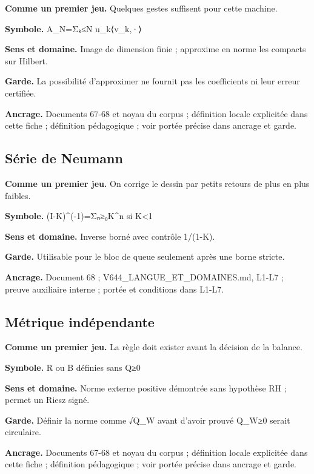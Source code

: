 \documentclass[
  9pt,
  a4paper,
]{article}
\begin{document}
\textbf{Comme un premier jeu.} Quelques gestes suffisent pour cette
machine.

\textbf{Symbole.} A\_N=Σₖ≤N u\_k⟨v\_k,·⟩

\textbf{Sens et domaine.} Image de dimension finie ; approxime en norme
les compacts sur Hilbert.

\textbf{Garde.} La possibilité d'approximer ne fournit pas les
coefficients ni leur erreur certifiée.

\textbf{Ancrage.} Documents 67-68 et noyau du corpus ; définition locale
explicitée dans cette fiche ; définition pédagogique ; voir portée
précise dans ancrage et garde.

\hypertarget{suxe9rie-de-neumann}{%
\subsection{Série de Neumann}\label{suxe9rie-de-neumann}}

\textbf{Comme un premier jeu.} On corrige le dessin par petits retours
de plus en plus faibles.

\textbf{Symbole.} (I-K)\^{}(-1)=Σₙ≥₀K\^{}n si
\textbar\textbar K\textbar\textbar\textless1

\textbf{Sens et domaine.} Inverse borné avec contrôle
1/(1-\textbar\textbar K\textbar\textbar).

\textbf{Garde.} Utilisable pour le bloc de queue seulement après une
borne stricte.

\textbf{Ancrage.} Document 68 ; V644\_LANGUE\_ET\_DOMAINES.md, L1-L7 ;
preuve auxiliaire interne ; portée et conditions dans L1-L7.

\hypertarget{muxe9trique-induxe9pendante}{%
\subsection{Métrique indépendante}\label{muxe9trique-induxe9pendante}}

\textbf{Comme un premier jeu.} La règle doit exister avant la décision
de la balance.

\textbf{Symbole.} R ou B définies sans Q≥0

\textbf{Sens et domaine.} Norme externe positive démontrée sans
hypothèse RH ; permet un Riesz signé.

\textbf{Garde.} Définir la norme comme √Q\_W avant d'avoir prouvé Q\_W≥0
serait circulaire.

\textbf{Ancrage.} Documents 67-68 et noyau du corpus ; définition locale
explicitée dans cette fiche ; définition pédagogique ; voir portée
précise dans ancrage et garde.
\end{document}
